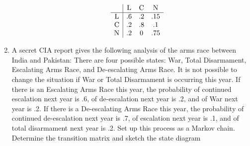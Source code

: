 \documentclass{hw}
\begin{document}
\begin{enumerate}
\begin{enumerate}
\begin{minipage}{0.5\textwidth}
\[
\begin{array}{c | c c c}
& \text{L} & \text{C} & \text{N}\\
\hline
\text{L} & .6 & .2 & .15\\
\text{C} & .2 & .8 & .1\\
\text{N} & .2 & 0 & .75
\end{array}
\]
\end{minipage}
\begin{minipage}{0.5\textwidth}
\begin{center}
\end{center}
\end{minipage}
\end{enumerate}

\item A secret CIA report gives the following analysis of the arms race between India and Pakistan:
There are four possible states: War, Total Disarmament, Escalating Arms Race, and De-escalating
Arms Race. It is not possible to change the situation if War or Total Disarmament is occurring this
year. If there is an Escalating Arms Race this year, the probability of continued escalation next
year is .6, of de-escalation next year is .2, and of War next year is .2. If there is a
De-escalating Arms Race this year, the probability of continued de-escalation next year is .7, of
escalation next year is .1, and of total disarmament next year is .2. Set up this process as a
Markov chain. Determine the transition matrix and sketch the state diagram


\end{enumerate}
\end{document}
